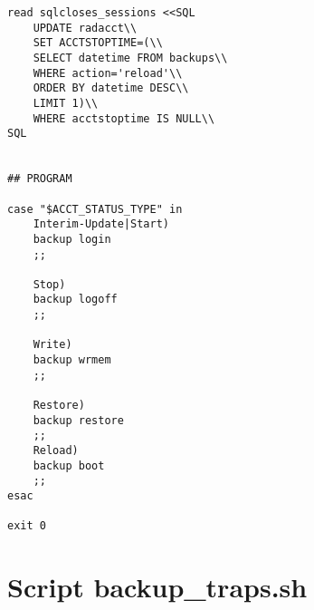 \begin{lstlisting}
read sqlcloses_sessions <<SQL
    UPDATE radacct\\
    SET ACCTSTOPTIME=(\\
	SELECT datetime FROM backups\\
	WHERE action='reload'\\
	ORDER BY datetime DESC\\
	LIMIT 1)\\
    WHERE acctstoptime IS NULL\\
SQL


## PROGRAM

case "$ACCT_STATUS_TYPE" in
    Interim-Update|Start)
	backup login
    ;;

    Stop)
	backup logoff
    ;;

    Write)
	backup wrmem
    ;;

    Restore)
	backup restore
    ;;
    Reload)
	backup boot
    ;;
esac

exit 0

\end{lstlisting}

\newpage
\section{Script backup\_traps.sh}


